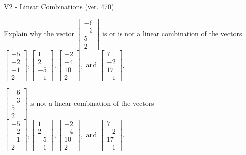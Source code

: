 \begin{exercise}
  \begin{exerciseTitle}V2 - Linear Combinations (ver. 470)\end{exerciseTitle}
  \begin{exerciseStatement}
    Explain why the vector \(\left[\begin{array}{c}
-6 \\
-3 \\
5 \\
2
\end{array}\right]\)  is or is not a linear 
	combination of the vectors \(\left[\begin{array}{c}
-5 \\
-2 \\
-1 \\
2
\end{array}\right] , \left[\begin{array}{c}
1 \\
2 \\
-5 \\
-1
\end{array}\right] , \left[\begin{array}{c}
-2 \\
-4 \\
10 \\
2
\end{array}\right] , \text{ and } \left[\begin{array}{c}
7 \\
-2 \\
17 \\
-1
\end{array}\right]\).
	


  \end{exerciseStatement}
  \begin{exerciseAnswer}
   \(\left[\begin{array}{c}
-6 \\
-3 \\
5 \\
2
\end{array}\right]\) 
  	 is not  
	a linear combination of the vectors \(\left[\begin{array}{c}
-5 \\
-2 \\
-1 \\
2
\end{array}\right] , \left[\begin{array}{c}
1 \\
2 \\
-5 \\
-1
\end{array}\right] , \left[\begin{array}{c}
-2 \\
-4 \\
10 \\
2
\end{array}\right] , \text{ and } \left[\begin{array}{c}
7 \\
-2 \\
17 \\
-1
\end{array}\right]\).


\end{exerciseAnswer}
\end{exercise}

